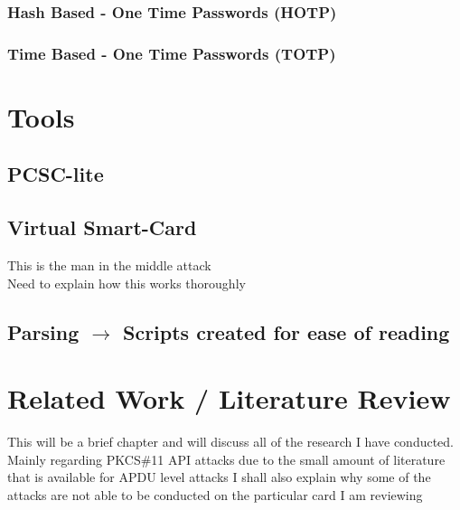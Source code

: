 \documentclass[bsc,frontabs,twoside,singlespacing,parskip,deptreport]{infthesis}     %
\begin{document}
\subsection{Hash Based - One Time Passwords (HOTP)}
\subsection{Time Based - One Time Passwords (TOTP)}





\chapter{Tools}

\section{PCSC-lite}

\section{Virtual Smart-Card}
This is the man in the middle attack\\
Need to explain how this works thoroughly

\section{Parsing $\rightarrow$ Scripts created for ease of reading}







\chapter{Related Work / Literature Review}

This will be a brief chapter and will discuss all of the research I have conducted.\\
Mainly regarding PKCS\#11 API attacks due to the small amount of literature that is available for APDU level attacks
I shall also explain why some of the attacks are not able to be conducted on the particular card I am reviewing
\end{document}
